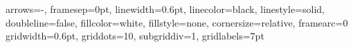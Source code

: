 \newcommand{\ArrowOnStateCoef}{}
\newcommand{\ArrowOnMediumState}{1.5}
\newcommand{\ArrowOnSmallState}{1.7} 
\newcommand{\ArrowOnLargeState}{1.3}
\newcommand{\ArrowOnVerySmallState}{5} 
\newlength{\VertShiftH} \settoheight{\VertShiftH}{$\{$}
\newlength{\VertShiftD} \settodepth{\VertShiftD}{$\{$}
\newlength{\VertShift}
\setlength{\VertShift}{.5\VertShiftD-.5\VertShiftH}
\newif\ifVCFrame
\newcommand{\HideFrame}{\VCFramefalse}
\newcommand{\ShowFrame}{\VCFrametrue}
\newif\ifVCGrid
\newcommand{\HideGrid}{\VCGridfalse}
\newcommand{\ShowGrid}{\VCGridtrue}
\newif\ifVCRigidLabel
\newcommand{\RigidLabel}{\VCRigidLabeltrue}
\newcommand{\SwivelLabel}{\VCRigidLabelfalse}
\newif\ifVCStateLabelBaseLine
\newcommand{\AlignedLabel}{\VCStateLabelBaseLinetrue}
\newcommand{\FloatingLabel}{\VCStateLabelBaseLinefalse}
\HideFrame
\HideGrid
\RigidLabel
\FloatingLabel
%
           {arrows=-,%
            framesep=0pt,%
            linewidth=0.6pt,%
            linecolor=black,%
            linestyle=solid,%
            doubleline=false,%
            fillcolor=white,%
            fillstyle=none,%
            cornersize=relative,%
            framearc=0}%
\newcommand{\FrameStyle}{\psset{style=VaucFrameStyle}}
%
           {gridwidth=0.6pt,%
            griddots=10,%
            subgriddiv=1,%
            gridlabels=7pt}
\newcommand{\GridStyle}{\psset{style=VaucGridStyle}}
\newenvironment{VCPicture}[2][.5]%
   {\settoheight{\VertShiftH}{$\{$}%
    \settodepth{\VertShiftD}{$\{$}%
    \setlength{\VertShift}{.5\VertShiftD-.5\VertShiftH}%
    \begin{pspicture}[#1]#2%
       \ifVCFrame \FrameStyle \psframe#2\fi%
       \ifVCGrid \FrameStyle\GridStyle \psgrid#2\fi%
   }%
   {\RstState\RstEdge\end{pspicture}}

